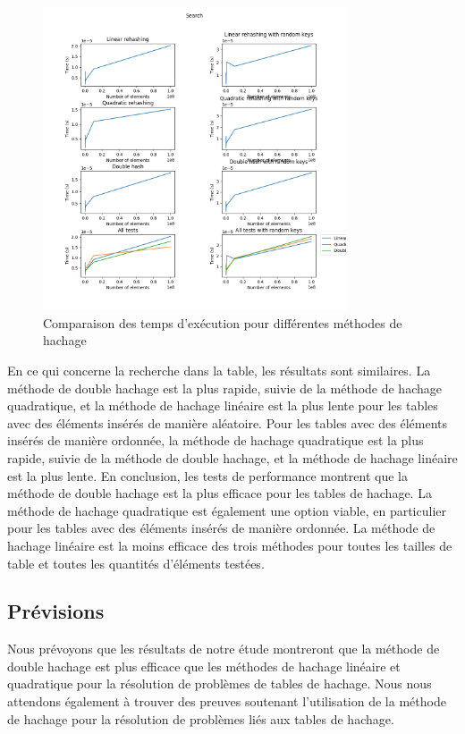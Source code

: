 \documentclass[12pt]{article}
\begin{document}
    \begin{figure}[h]
        \centering
        \includegraphics[width=0.8\textwidth]{Search}
        \caption{Comparaison des temps d'exécution pour différentes méthodes de hachage}
        \label{fig:performance_tests_search}
    \end{figure}
    En ce qui concerne la recherche dans la table, les résultats sont similaires.
    La méthode de double hachage est la plus rapide, suivie de la méthode de hachage quadratique, et la méthode de hachage linéaire est la plus lente pour les tables avec des éléments insérés de manière aléatoire.
    Pour les tables avec des éléments insérés de manière ordonnée, la méthode de hachage quadratique est la plus rapide, suivie de la méthode de double hachage, et la méthode de hachage linéaire est la plus lente.
    En conclusion, les tests de performance montrent que la méthode de double hachage est la plus efficace pour les tables de hachage.
    La méthode de hachage quadratique est également une option viable, en particulier pour les tables avec des éléments insérés de manière ordonnée.
    La méthode de hachage linéaire est la moins efficace des trois méthodes pour toutes les tailles de table et toutes les quantités d'éléments testées.

    \subsection{Prévisions}\label{subsec:previsions}
    Nous prévoyons que les résultats de notre étude montreront que la méthode de double hachage est plus efficace que les méthodes de hachage linéaire et quadratique pour la résolution de problèmes de tables de hachage.
    Nous nous attendons également à trouver des preuves soutenant l'utilisation de la méthode de hachage pour la résolution de problèmes liés aux tables de hachage.
\end{document}
